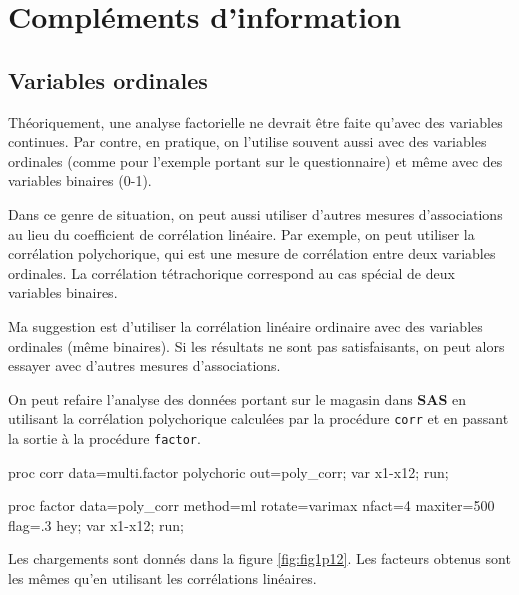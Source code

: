 \documentclass[
  11pt,
  letterpaper,
]{book}
\newenvironment{Shaded}{\begin{snugshade}}{\end{snugshade}}
\newcommand{\NormalTok}[1]{#1}
\theoremstyle{definition}
\theoremstyle{definition}
\theoremstyle{definition}
\theoremstyle{definition}
\theoremstyle{remark}
\begin{document}
\hypertarget{compluxe9ments-dinformation}{%
\section{Compléments d'information}\label{compluxe9ments-dinformation}}

\hypertarget{variables-ordinales}{%
\subsection{Variables ordinales}\label{variables-ordinales}}

Théoriquement, une analyse factorielle ne devrait être faite qu'avec des
variables continues. Par contre, en pratique, on l'utilise souvent aussi avec des variables ordinales (comme pour l'exemple portant sur le questionnaire) et même avec des variables binaires (0-1).

Dans ce genre de situation, on peut aussi utiliser d'autres mesures d'associations au lieu du coefficient de corrélation linéaire. Par exemple, on peut utiliser la corrélation polychorique, qui est une mesure de corrélation entre deux variables ordinales. La corrélation tétrachorique correspond au cas spécial de deux variables binaires.

Ma suggestion est d'utiliser la corrélation linéaire ordinaire avec des variables ordinales (même binaires). Si les résultats ne sont pas satisfaisants, on peut alors essayer avec d'autres mesures d'associations.

On peut refaire l'analyse des données portant sur le magasin dans \textbf{SAS} en utilisant la corrélation polychorique calculées par la procédure \texttt{corr} et en passant la sortie à la procédure \texttt{factor}.

\begin{Shaded}
\begin{Highlighting}[]
\NormalTok{proc corr data=multi.factor polychoric out=poly\_corr;}
\NormalTok{var x1{-}x12;}
\NormalTok{run;}

\NormalTok{proc factor data=poly\_corr}
\NormalTok{ method=ml rotate=varimax nfact=4}
\NormalTok{ maxiter=500 flag=.3 hey;}
\NormalTok{ var x1{-}x12;}
\NormalTok{run;}
\end{Highlighting}
\end{Shaded}

Les chargements sont donnés dans la figure \ref{fig:fig1p12}. Les facteurs obtenus sont les mêmes qu'en utilisant les corrélations linéaires.
\end{document}
